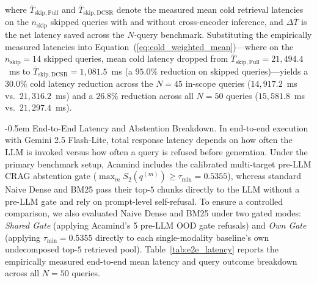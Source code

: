 \documentclass[10pt]{SPIIRAS_Proceedings}
\makeatletter
\renewcommand\subsection{\@startsection{subsection}{2}{\parindent}%
  {\z@}%
  {-0.5em}%
  {\normalfont\normalsize\bfseries}}
\makeatother
\begin{document}
\noindent where $\overline{T}_{\mathrm{skip, Full}}$ and $\overline{T}_{\mathrm{skip, DCSR}}$ denote the measured mean cold retrieval latencies on the $n_{\mathrm{skip}}$ skipped queries with and without cross-encoder inference, and $\Delta\overline{T}$ is the net latency saved across the $N$-query benchmark. Substituting the empirically measured latencies into Equation~(\ref{eq:cold_weighted_mean})---where on the $n_{\mathrm{skip}} = 14$ skipped queries, mean cold latency dropped from $\overline{T}_{\mathrm{skip, Full}} = 21,494.4$~ms to $\overline{T}_{\mathrm{skip, DCSR}} = 1,081.5$~ms (a $95.0\%$ reduction on skipped queries)---yields a $30.0\%$ cold latency reduction across the $N = 45$ in-scope queries ($14,917.2$~ms vs.\ $21,316.2$~ms) and a $26.8\%$ reduction across all $N = 50$ queries ($15,581.8$~ms vs.\ $21,297.4$~ms).

\subsection{End-to-End Latency and Abstention Breakdown.} \label{sec:e2e_evaluation} In end-to-end execution with Gemini 2.5 Flash-Lite, total response latency depends on how often the LLM is invoked versus how often a query is refused before generation. Under the primary benchmark setup, Acamind includes the calibrated multi-target pre-LLM CRAG abstention gate ($\max_m S_2(q^{(m)}) \ge \tau_{\min} = 0.5355$), whereas standard Naive Dense and BM25 pass their top-$5$ chunks directly to the LLM without a pre-LLM gate and rely on prompt-level self-refusal. To ensure a controlled comparison, we also evaluated Naive Dense and BM25 under two gated modes: \textit{Shared Gate} (applying Acamind's 5 pre-LLM OOD gate refusals) and \textit{Own Gate} (applying $\tau_{\min} = 0.5355$ directly to each single-modality baseline's own undecomposed top-$5$ retrieved pool). Table~\ref{tab:e2e_latency} reports the empirically measured end-to-end mean latency and query outcome breakdown across all $N = 50$ queries.
\end{document}
